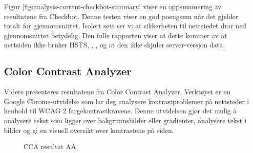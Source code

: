 Figur \ref{fig:analysis-current-checkbot-summary} viser en oppsummering av resultatene fra Checkbot. Denne testen viser en god poengsum når det gjelder totalt for gjennomsnittet. Isolert sett ser vi at sikkerheten til nettstedet drar ned gjennomsnittet betydelig. Den fulle rapporten viser at dette kommer av at nettsiden ikke bruker HSTS, , ,  og at den ikke skjuler server-versjon data.

\subsection{Color Contrast Analyzer}
\label{sec:analysis-current-color-contrast-analyzer}
Videre presenteres resultatene fra Color Contrast Analyzer. Verktøyet \cite{ncstate2013cca} er en Google Chrome-utvidelse som lar deg analysere kontrastproblemer på nettsteder i henhold til WCAG 2 fargekontrastkravene. Denne utvidelsen gjør det mulig å analysere tekst som ligger over bakgrunnsbilder eller gradienter, analysere tekst i bilder og gi en visuell oversikt over kontrastene på siden.

\begin{figure}[H]
    \centering
    \caption{CCA resultat AA}
    \label{fig:analysis-current-cca-aa}
\end{figure}

